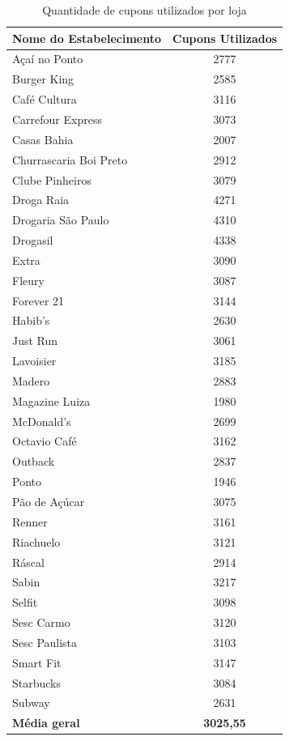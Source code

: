 \documentclass[12pt]{article}
\begin{document}
\begin{table}[H]
\centering
\begin{tabular}{|l|c|}
\hline
\textbf{Nome do Estabelecimento} & \textbf{Cupons Utilizados} \\
\hline
Açaí no Ponto & 2777 \\
Burger King & 2585 \\
Café Cultura & 3116 \\
Carrefour Express & 3073 \\
Casas Bahia & 2007 \\
Churrascaria Boi Preto & 2912 \\
Clube Pinheiros & 3079 \\
Droga Raia & 4271 \\
Drogaria São Paulo & 4310 \\
Drogasil & 4338 \\
Extra & 3090 \\
Fleury & 3087 \\
Forever 21 & 3144 \\
Habib's & 2630 \\
Just Run & 3061 \\
Lavoisier & 3185 \\
Madero & 2883 \\
Magazine Luiza & 1980 \\
McDonald's & 2699 \\
Octavio Café & 3162 \\
Outback & 2837 \\
Ponto & 1946 \\
Pão de Açúcar & 3075 \\
Renner & 3161 \\
Riachuelo & 3121 \\
Ráscal & 2914 \\
Sabin & 3217 \\
Selfit & 3098 \\
Sesc Carmo & 3120 \\
Sesc Paulista & 3103 \\
Smart Fit & 3147 \\
Starbucks & 3084 \\
Subway & 2631 \\
\hline
\textbf{Média geral} & \textbf{3025,55} \\
\hline
\end{tabular}
\caption{Quantidade de cupons utilizados por loja}
\end{table}

\vspace{0.5cm}
\end{document}
